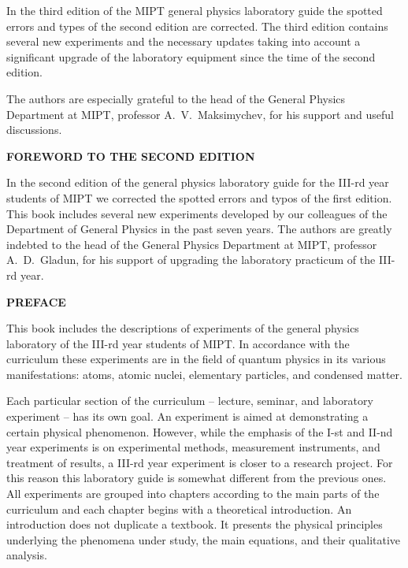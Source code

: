 
\Preword

In the third edition of the MIPT general physics laboratory guide the spotted errors and types of the second edition are corrected. The third edition contains several new experiments and the necessary  updates taking into account a significant upgrade of the laboratory equipment since the time of the second edition.

The authors are especially grateful to the head of the General Physics Department at MIPT, professor A.~V.~Maksimychev, for his support and useful discussions. 

\vspace{1.0cm} {\sffamily\upshape\bfseries\fontsize{11pt}{12.5pt}\selectfont \noindent FOREWORD TO THE SECOND EDITION} \vspace{0.6cm}

\noindent In the second edition of the general physics laboratory guide for the III-rd year students of  MIPT we corrected the spotted errors and typos of the first edition. This book includes several new experiments developed by our colleagues of the Department of General Physics in the past seven years. The authors are greatly indebted to the head of the General Physics Department at MIPT, professor A.~D.~Gladun, for his support of upgrading the laboratory practicum of the III-rd year. 

\vspace{1.0cm} {\sffamily\upshape\bfseries\fontsize{11pt}{12.5pt}\selectfont \noindent PREFACE} \vspace{0.6cm}

\noindent This book includes the descriptions of experiments of the general physics laboratory of the III-rd year students of MIPT. In accordance with the curriculum these experiments are in the field of quantum physics in its various manifestations: atoms, atomic nuclei, elementary particles, and condensed matter. 

Each particular section of the curriculum -- lecture, seminar, and laboratory experiment -- has its own goal. An experiment is aimed at demonstrating a certain physical phenomenon. However, while the emphasis of the I-st and II-nd year experiments is on experimental methods, measurement instruments, and treatment of results, a III-rd year experiment is closer to a research project. For this reason this laboratory guide is somewhat different from the previous ones. All experiments are grouped into chapters according to the main parts of the curriculum and each chapter begins with a theoretical introduction. An introduction does not duplicate a textbook. It presents the physical principles underlying the phenomena under study, the main equations, and their qualitative analysis. 

